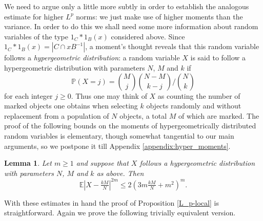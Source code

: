 \documentclass[12pt,a4paper,reqno]{amsart}
\numberwithin{equation}{section}
\theoremstyle{plain}
\newtheorem{lemma}[theorem]{Lemma}
\theoremstyle{definition}
\renewcommand{\leq}{\leqslant}
\renewcommand{\geq}{\geqslant}
\def\E{\mathbb{E}}
\def\P{\mathbb{P}}
\begin{document}
We need to argue only a little more subtly in order to establish the analogous estimate for higher $L^p$ norms: we just make use of higher moments than the variance. In order to do this we shall need some more information about random variables of the type $1_C*1_B(x)$ considered above. Since $1_C*1_B(x) = |C \cap xB^{-1}|$, a moment's thought reveals that this random variable follows a \emph{hypergeometric distribution}: a random variable $X$ is said to follow a hypergeometric distribution with parameters $N$, $M$ and $k$ if 
\[ \P(X = j) = \binom{M}{j}\binom{N-M}{k-j}\Big/\binom{N}{k} \]
for each integer $j \geq 0$. Thus one may think of $X$ as counting the number of marked objects one obtains when selecting $k$ objects randomly and without replacement from a population of $N$ objects, a total $M$ of which are marked. The proof of the following bounds on the moments of hypergeometrically distributed random variables is elementary, though somewhat tangential to our main arguments, so we postpone it till Appendix \ref{appendix:hyper_moments}.

\begin{lemma}\label{hyper_moments}
Let $m \geq 1$ and suppose that $X$ follows a hypergeometric distribution with parameters $N$, $M$ and $k$ as above. Then
\[ \E |X - \tfrac{kM}{N}|^{2m} \leq 2\left(3m \tfrac{k M}{N} + m^2 \right)^m. \]
\end{lemma}

With these estimates in hand the proof of Proposition \ref{L_p-local} is straightforward. Again we prove the following trivially equivalent version.
\end{document}

